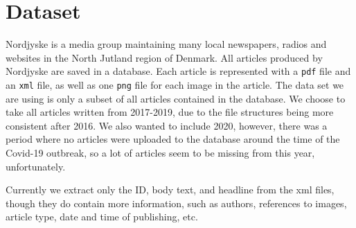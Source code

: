 \section{Dataset}
Nordjyske is a media group maintaining many local newspapers, radios and websites in the North Jutland region of Denmark.
All articles produced by Nordjyske are saved in a database.
Each article is represented with a \texttt{pdf} file and an \texttt{xml} file, as well as one \texttt{png} file for each image in the article.
The data set we are using is only a subset of all articles contained in the database.
We choose to take all articles written from 2017-2019, due to the file structures being more consistent after 2016.
We also wanted to include 2020, however, there was a period where no articles were uploaded to the database around the time of the Covid-19 outbreak, so a lot of articles seem to be missing from this year, unfortunately.

Currently we extract only the ID, body text, and headline from the xml files, though they do contain more information, such as authors, references to images, article type, date and time of publishing, etc.
